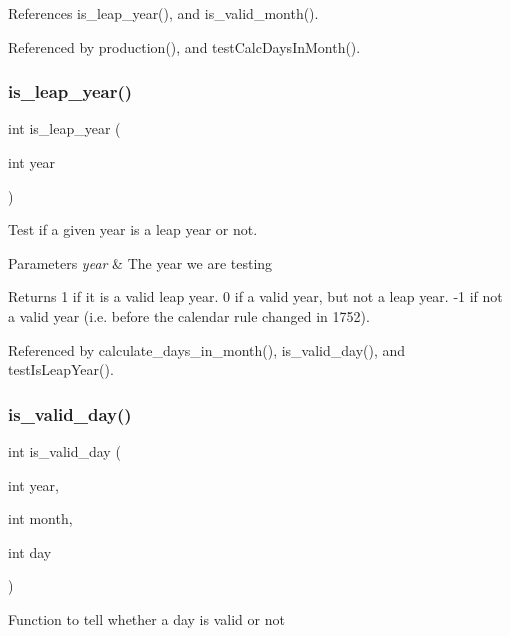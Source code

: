 References is\+\_\+leap\+\_\+year(), and is\+\_\+valid\+\_\+month().



Referenced by production(), and test\+Calc\+Days\+In\+Month().

\mbox{\label{production_8c_a89b1fdc34c29bc50b397019f5e32f7af}} 
\subsubsection{is\+\_\+leap\+\_\+year()}
{\footnotesize\ttfamily int is\+\_\+leap\+\_\+year (\begin{DoxyParamCaption}\item[{int}]{year }\end{DoxyParamCaption})}

Test if a given year is a leap year or not. 
\begin{DoxyParams}{Parameters}
{\em year} & The year we are testing \\
\hline
\end{DoxyParams}
\begin{DoxyReturn}{Returns}
1 if it is a valid leap year. 0 if a valid year, but not a leap year. -\/1 if not a valid year (i.\+e. before the calendar rule changed in 1752). 
\end{DoxyReturn}


Referenced by calculate\+\_\+days\+\_\+in\+\_\+month(), is\+\_\+valid\+\_\+day(), and test\+Is\+Leap\+Year().

\mbox{\label{production_8c_a80cec9ca574bbc02a7ef21b2e8f75477}} 
\subsubsection{is\+\_\+valid\+\_\+day()}
{\footnotesize\ttfamily int is\+\_\+valid\+\_\+day (\begin{DoxyParamCaption}\item[{int}]{year,  }\item[{int}]{month,  }\item[{int}]{day }\end{DoxyParamCaption})}

Function to tell whether a day is valid or not

